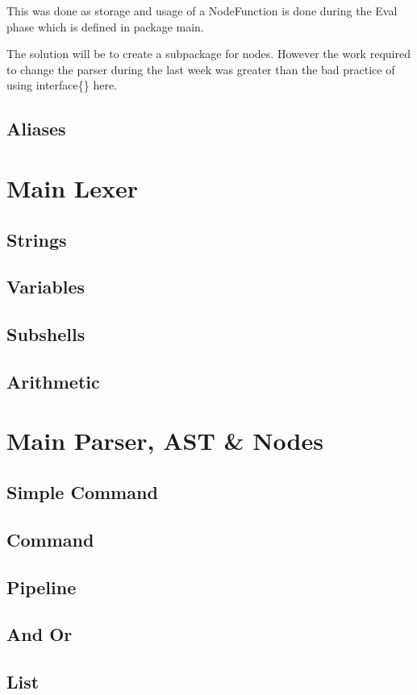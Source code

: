 This was done as storage and usage of a NodeFunction is done during the Eval phase which is defined in package main.

The solution will be to create a subpackage for nodes.
However the work required to change the parser during the last week was greater than the bad practice of using interface\{\} here.

\subsection{Aliases}

\section{Main Lexer}

\subsection{Strings}
\subsection{Variables}
\subsection{Subshells}
\subsection{Arithmetic}
\label{sec:main-lexer-arith}

\section{Main Parser, AST \& Nodes}

\subsection{Simple Command}
\subsection{Command}
\subsection{Pipeline}
\subsection{And Or}
\subsection{List}

